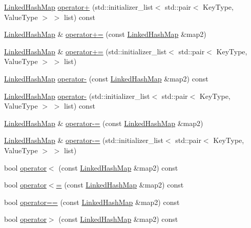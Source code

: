 \begin{DoxyCompactItemize}
\item 
\mbox{\hyperlink{classLinkedHashMap}{Linked\+Hash\+Map}} \mbox{\hyperlink{classLinkedHashMap_af9702bd0fcc2d2320899006cd659f934}{operator+}} (std\+::initializer\+\_\+list$<$ std\+::pair$<$ Key\+Type, Value\+Type $>$ $>$ list) const
\item 
\mbox{\hyperlink{classLinkedHashMap}{Linked\+Hash\+Map}} \& \mbox{\hyperlink{classLinkedHashMap_a41cb6fea75c4d49ba2c9d3880980a520}{operator+=}} (const \mbox{\hyperlink{classLinkedHashMap}{Linked\+Hash\+Map}} \&map2)
\item 
\mbox{\hyperlink{classLinkedHashMap}{Linked\+Hash\+Map}} \& \mbox{\hyperlink{classLinkedHashMap_a7aa2b6c68b448ea09e21f0b662035d4c}{operator+=}} (std\+::initializer\+\_\+list$<$ std\+::pair$<$ Key\+Type, Value\+Type $>$ $>$ list)
\item 
\mbox{\hyperlink{classLinkedHashMap}{Linked\+Hash\+Map}} \mbox{\hyperlink{classLinkedHashMap_aeb0ad54e8008a28ea0578ba8825a6e77}{operator-\/}} (const \mbox{\hyperlink{classLinkedHashMap}{Linked\+Hash\+Map}} \&map2) const
\item 
\mbox{\hyperlink{classLinkedHashMap}{Linked\+Hash\+Map}} \mbox{\hyperlink{classLinkedHashMap_a37609d0fc11658bfbe010c4f7c39c4b2}{operator-\/}} (std\+::initializer\+\_\+list$<$ std\+::pair$<$ Key\+Type, Value\+Type $>$ $>$ list) const
\item 
\mbox{\hyperlink{classLinkedHashMap}{Linked\+Hash\+Map}} \& \mbox{\hyperlink{classLinkedHashMap_af9f41a756eeffcfbb82c0801ddd1bb71}{operator-\/=}} (const \mbox{\hyperlink{classLinkedHashMap}{Linked\+Hash\+Map}} \&map2)
\item 
\mbox{\hyperlink{classLinkedHashMap}{Linked\+Hash\+Map}} \& \mbox{\hyperlink{classLinkedHashMap_a391bba5f3e4ae6dfa5cd29609d3af004}{operator-\/=}} (std\+::initializer\+\_\+list$<$ std\+::pair$<$ Key\+Type, Value\+Type $>$ $>$ list)
\item 
bool \mbox{\hyperlink{classLinkedHashMap_a0943774682de2481db27e4469efb0eca}{operator$<$}} (const \mbox{\hyperlink{classLinkedHashMap}{Linked\+Hash\+Map}} \&map2) const
\item 
bool \mbox{\hyperlink{classLinkedHashMap_afb27a9d637364adfd18ce35820a61e59}{operator$<$=}} (const \mbox{\hyperlink{classLinkedHashMap}{Linked\+Hash\+Map}} \&map2) const
\item 
bool \mbox{\hyperlink{classLinkedHashMap_a4f93875138dce711800e52c55e10d11c}{operator==}} (const \mbox{\hyperlink{classLinkedHashMap}{Linked\+Hash\+Map}} \&map2) const
\item 
bool \mbox{\hyperlink{classLinkedHashMap_ad692c47a75cbe1f2d266c2de4ff25d90}{operator$>$}} (const \mbox{\hyperlink{classLinkedHashMap}{Linked\+Hash\+Map}} \&map2) const

\end{DoxyCompactItemize}
